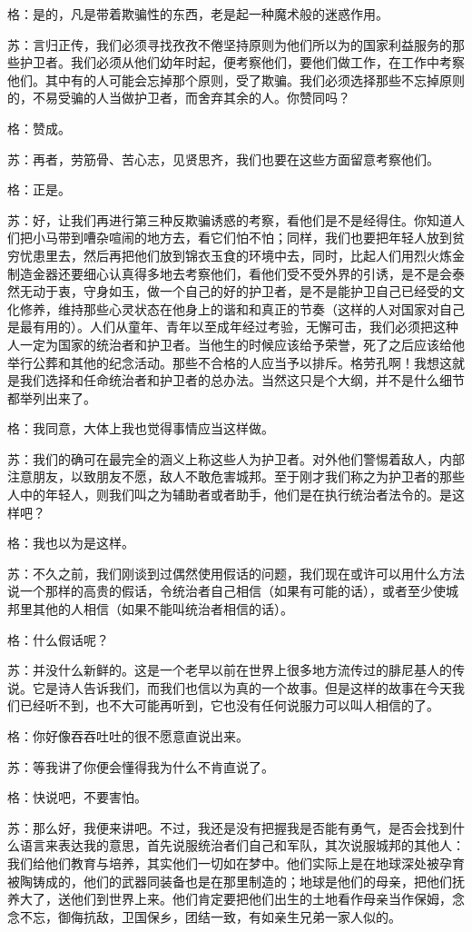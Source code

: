 \documentclass[11pt,oneside]{book}
\begin{document}
\begin{common-format}
格：是的，凡是带着欺骗性的东西，老是起一种魔术般的迷惑作用。

苏：言归正传，我们必须寻找孜孜不倦坚持原则为他们所以为的国家利益服务的那些护卫者。我们必须从他们幼年时起，便考察他们，要他们做工作，在工作中考察他们。其中有的人可能会忘掉那个原则，受了欺骗。我们必须选择那些不忘掉原则的，不易受骗的人当做护卫者，而舍弃其余的人。你赞同吗？

格：赞成。

苏：再者，劳筋骨、苦心志，见贤思齐，我们也要在这些方面留意考察他们。

格：正是。

苏：好，让我们再进行第三种反欺骗诱惑的考察，看他们是不是经得住。你知道人们把小马带到嘈杂喧闹的地方去，看它们怕不怕；同样，我们也要把年轻人放到贫穷忧患里去，然后再把他们放到锦衣玉食的环境中去，同时，比起人们用烈火炼金制造金器还要细心认真得多地去考察他们，看他们受不受外界的引诱，是不是会泰然无动于衷，守身如玉，做一个自己的好的护卫者，是不是能护卫自己已经受的文化修养，维持那些心灵状态在他身上的谐和和真正的节奏（这样的人对国家对自己是最有用的）。人们从童年、青年以至成年经过考验，无懈可击，我们必须把这种人一定为国家的统治者和护卫者。当他生的时候应该给予荣誉，死了之后应该给他举行公葬和其他的纪念活动。那些不合格的人应当予以排斥。格劳孔啊！我想这就是我们选择和任命统治者和护卫者的总办法。当然这只是个大纲，并不是什么细节都举列出来了。

格：我同意，大体上我也觉得事情应当这样做。

苏：我们的确可在最完全的涵义上称这些人为护卫者。对外他们警惕着敌人，内部注意朋友，以致朋友不愿，敌人不敢危害城邦。至于刚才我们称之为护卫者的那些人中的年轻人，则我们叫之为辅助者或者助手，他们是在执行统治者法令的。是这样吧？

格：我也以为是这样。

苏：不久之前，我们刚谈到过偶然使用假话的问题，我们现在或许可以用什么方法说一个那样的高贵的假话，令统治者自己相信（如果有可能的话），或者至少使城邦里其他的人相信（如果不能叫统治者相信的话）。

格：什么假话呢？

苏：并没什么新鲜的。这是一个老早以前在世界上很多地方流传过的腓尼基人的传说。它是诗人告诉我们，而我们也信以为真的一个故事。但是这样的故事在今天我们已经听不到，也不大可能再听到，它也没有任何说服力可以叫人相信的了。

格：你好像吞吞吐吐的很不愿意直说出来。

苏：等我讲了你便会懂得我为什么不肯直说了。

格：快说吧，不要害怕。

苏：那么好，我便来讲吧。不过，我还是没有把握我是否能有勇气，是否会找到什么语言来表达我的意思，首先说服统治者们自己和军队，其次说服城邦的其他人：我们给他们教育与培养，其实他们一切如在梦中。他们实际上是在地球深处被孕育被陶铸成的，他们的武器同装备也是在那里制造的；地球是他们的母亲，把他们抚养大了，送他们到世界上来。他们肯定要把他们出生的土地看作母亲当作保姆，念念不忘，御侮抗敌，卫国保乡，团结一致，有如亲生兄弟一家人似的。


\end{common-format}
\end{document}
